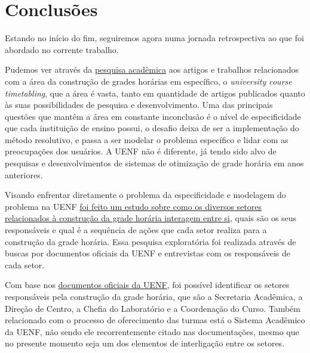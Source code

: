 \chapter{Conclusões} \label{chap:conclusoes} %

Estando no início do fim, seguiremos agora numa jornada retrospectiva ao que foi abordado no corrente trabalho.


Pudemos ver através da \hyperref[chap:marco]{pesquisa acadêmica} aos artigos e trabalhos relacionados com a área da construção de grades horárias em específico, o \textit{university course timetabling}, que a área é vasta, tanto em quantidade de artigos publicados quanto às suas possibilidades de pesquisa e desenvolvimento. Uma das principais questões que mantêm a área em constante inconclusão é o nível de especificidade que cada instituição de ensino possui, o desafio deixa de ser a implementação do método resolutivo, e passa a ser modelar o problema específico e lidar com as preocupações dos usuários. A UENF não é diferente, já tendo sido alvo de pesquisas e desenvolvimentos de sistemas de otimização de grade horária em anos anteriores.


Visando enfrentar diretamente o problema da especificidade e modelagem do problema na UENF \hyperref[chap:instituicao]{foi feito um estudo sobre como os diversos setores relacionados à construção da grade horária interagem entre si}, quais são os seus responsáveis e qual é a sequência de ações que cada setor realiza para a construção da grade horária. Essa pesquisa exploratória foi realizada através de buscas por documentos oficiais da UENF e entrevistas com os responsáveis de cada setor.



Com base nos \hyperref[sec:estatuto]{documentos oficiais da UENF}, foi possível identificar os setores responsáveis pela construção da grade horária, que são a Secretaria Acadêmica, a Direção de Centro, a Chefia do Laboratório e a Coordenação do Curso. Também relacionado com o processo de oferecimento das turmas está o Sistema Acadêmico da UENF, não sendo ele recorrentemente citado nas documentações, mesmo que no presente momento seja um dos elementos de interligação entre os setores.

